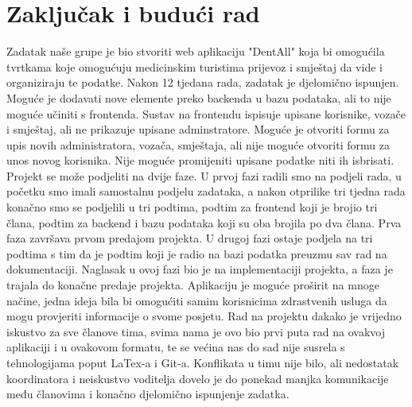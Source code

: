 \chapter{Zaključak i budući rad}
		
		
		 
		 Zadatak naše grupe je bio stvoriti web aplikaciju "DentAll" koja bi omogućila tvrtkama koje omogućuju medicinskim turistima prijevoz i smještaj da vide i organiziraju te podatke. Nakon 12 tjedana rada, zadatak je djelomično ispunjen. Moguće je dodavati nove elemente preko backenda u bazu podataka, ali to nije moguće učiniti s frontenda. Sustav na frontendu ispisuje upisane korisnike, vozače i smještaj, ali ne prikazuje upisane adminstratore. Moguće je otvoriti formu za upis novih administratora, vozača, smještaja, ali nije moguće otvoriti formu za unos novog korisnika. Nije moguće promijeniti upisane podatke niti ih isbrisati. %
		 \newline Projekt se može podjeliti na dvije faze. U prvoj fazi radili smo na podjeli rada, u početku smo imali samostalnu podjelu zadataka, a nakon otprilike tri tjedna rada konačno smo se podjelili u tri podtima, podtim za frontend koji je brojio tri člana, podtim za backend i bazu podataka koji su oba brojila po dva člana. Prva faza završava prvom predajom projekta.
		 \newline
		 U drugoj fazi ostaje podjela na tri podtima s tim da je podtim koji je radio na bazi podatka preuzmu sav rad na dokumentaciji. Naglasak u ovoj fazi bio je na implementaciji projekta, a faza je trajala do konačne predaje projekta.
		 \newline
		 Aplikaciju je moguće proširit na mnoge načine, jedna ideja bila bi omogućiti samim korisnicima zdrastvenih usluga da mogu provjeriti informacije o svome posjetu. Rad na projektu dakako je vrijedno iskustvo za sve članove tima, svima nama je ovo bio prvi puta rad na ovakvoj aplikaciji i u ovakovom formatu, te se većina nas do sad nije susrela s tehnologijama poput LaTex-a i Git-a. Konflikata u timu nije bilo, ali nedostatak koordinatora i neiskustvo voditelja dovelo je do ponekad manjka komunikacije među članovima i konačno djelomično ispunjenje zadatka.
		
		
		\eject 